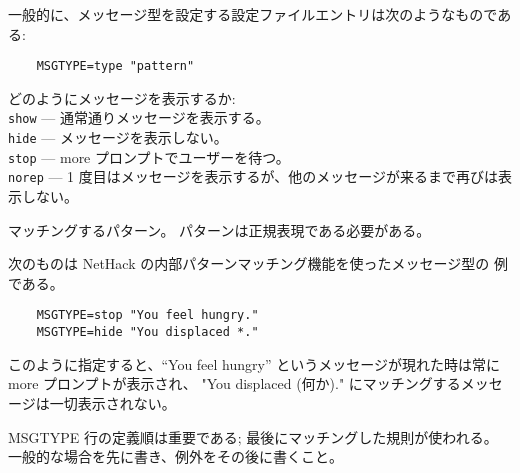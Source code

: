一般的に、メッセージ型を設定する設定ファイルエントリは次のようなものである:
\begin{verbatim}
    MSGTYPE=type "pattern"
\end{verbatim}
\blist{}
\item[\ib{type}]
どのようにメッセージを表示するか:
\\
{\tt show}  --- 通常通りメッセージを表示する。\\
{\tt hide}  --- メッセージを表示しない。\\
{\tt stop}  --- more プロンプトでユーザーを待つ。\\
{\tt norep} --- 1 度目はメッセージを表示するが、他のメッセージが来るまで再びは表示しない。
\item[\ib{pattern}]
マッチングするパターン。
パターンは正規表現である必要がある。
\elist

次のものは NetHack の内部パターンマッチング機能を使ったメッセージ型の
例である。

\begin{verbatim}
    MSGTYPE=stop "You feel hungry."
    MSGTYPE=hide "You displaced *."
\end{verbatim}

このように指定すると、``You feel hungry'' というメッセージが現れた時は常に
more プロンプトが表示され、
"You displaced (何か)." にマッチングするメッセージは一切表示されない。

MSGTYPE 行の定義順は重要である; 最後にマッチングした規則が使われる。
一般的な場合を先に書き、例外をその後に書くこと。


